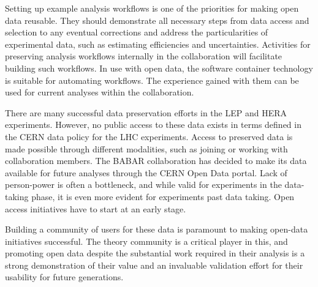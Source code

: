 \documentclass[11pt]{article}
\begin{document}
Setting up example analysis workflows is one of the priorities for making open data reusable. They should demonstrate all necessary steps from data access and selection to any eventual corrections and address the particularities of experimental data, such as estimating efficiencies and uncertainties. Activities for preserving analysis workflows internally in the collaboration will facilitate building such workflows. In use with open data, the software container technology is suitable for automating workflows. The experience gained with them can be used for current analyses within the collaboration.


There are many successful data preservation efforts in the LEP and HERA experiments. However, no public access to these data exists in terms defined in the CERN data policy for the LHC experiments. Access to preserved data is made possible through different modalities, such as joining or working with collaboration members. The BABAR collaboration has decided to make its data available for future analyses through the CERN Open Data portal. Lack of person-power is often a bottleneck, and while valid for experiments in the data-taking phase, it is even more evident for experiments past data taking. Open access initiatives have to start at an early stage.


Building a community of users for these data is paramount to making open-data initiatives successful. The theory community is a critical player in this, and promoting open data despite the substantial work required in their analysis is a strong demonstration of their value and an invaluable validation effort for their usability for future generations.
\end{document}
